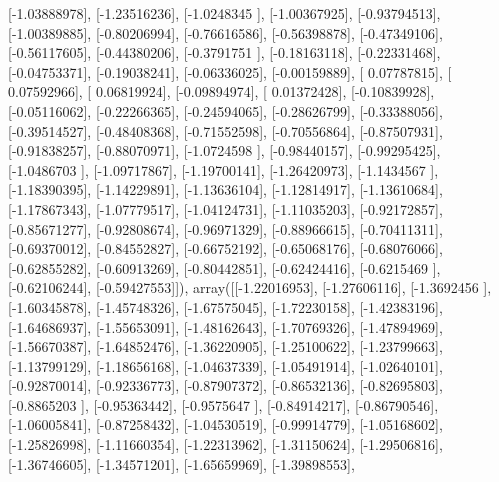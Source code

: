 \documentclass{article}
\begin{document}
       [-1.03888978],
       [-1.23516236],
       [-1.0248345 ],
       [-1.00367925],
       [-0.93794513],
       [-1.00389885],
       [-0.80206994],
       [-0.76616586],
       [-0.56398878],
       [-0.47349106],
       [-0.56117605],
       [-0.44380206],
       [-0.3791751 ],
       [-0.18163118],
       [-0.22331468],
       [-0.04753371],
       [-0.19038241],
       [-0.06336025],
       [-0.00159889],
       [ 0.07787815],
       [ 0.07592966],
       [ 0.06819924],
       [-0.09894974],
       [ 0.01372428],
       [-0.10839928],
       [-0.05116062],
       [-0.22266365],
       [-0.24594065],
       [-0.28626799],
       [-0.33388056],
       [-0.39514527],
       [-0.48408368],
       [-0.71552598],
       [-0.70556864],
       [-0.87507931],
       [-0.91838257],
       [-0.88070971],
       [-1.0724598 ],
       [-0.98440157],
       [-0.99295425],
       [-1.0486703 ],
       [-1.09717867],
       [-1.19700141],
       [-1.26420973],
       [-1.1434567 ],
       [-1.18390395],
       [-1.14229891],
       [-1.13636104],
       [-1.12814917],
       [-1.13610684],
       [-1.17867343],
       [-1.07779517],
       [-1.04124731],
       [-1.11035203],
       [-0.92172857],
       [-0.85671277],
       [-0.92808674],
       [-0.96971329],
       [-0.88966615],
       [-0.70411311],
       [-0.69370012],
       [-0.84552827],
       [-0.66752192],
       [-0.65068176],
       [-0.68076066],
       [-0.62855282],
       [-0.60913269],
       [-0.80442851],
       [-0.62424416],
       [-0.6215469 ],
       [-0.62106244],
       [-0.59427553]]), array([[-1.22016953],
       [-1.27606116],
       [-1.3692456 ],
       [-1.60345878],
       [-1.45748326],
       [-1.67575045],
       [-1.72230158],
       [-1.42383196],
       [-1.64686937],
       [-1.55653091],
       [-1.48162643],
       [-1.70769326],
       [-1.47894969],
       [-1.56670387],
       [-1.64852476],
       [-1.36220905],
       [-1.25100622],
       [-1.23799663],
       [-1.13799129],
       [-1.18656168],
       [-1.04637339],
       [-1.05491914],
       [-1.02640101],
       [-0.92870014],
       [-0.92336773],
       [-0.87907372],
       [-0.86532136],
       [-0.82695803],
       [-0.8865203 ],
       [-0.95363442],
       [-0.9575647 ],
       [-0.84914217],
       [-0.86790546],
       [-1.06005841],
       [-0.87258432],
       [-1.04530519],
       [-0.99914779],
       [-1.05168602],
       [-1.25826998],
       [-1.11660354],
       [-1.22313962],
       [-1.31150624],
       [-1.29506816],
       [-1.36746605],
       [-1.34571201],
       [-1.65659969],
       [-1.39898553],
\end{document}
